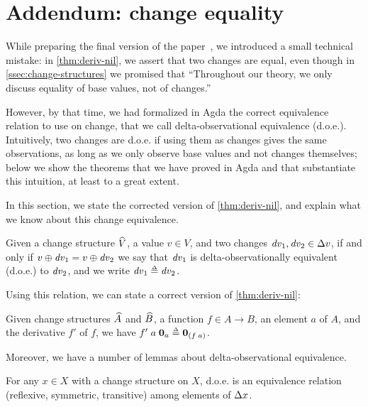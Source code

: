 \section{Addendum: change equality}
\label{sec:change-eq}

While preparing the final version of the paper~\citep{CaiEtAl2014ILC}, we introduced a
small technical mistake: in \cref{thm:deriv-nil}, we assert that
two changes are equal, even though in
\cref{ssec:change-structures} we promised that ``Throughout
our theory, we only discuss equality of base values, not of
changes.''

However, by that time, we had formalized in Agda the correct
equivalence relation to use on change, that we call
delta-observational equivalence (d.o.e.). Intuitively, two
changes are d.o.e. if using them as changes gives the same
observations, as long as we only observe base values and not
changes themselves; below we show the theorems that we have
proved in Agda and that substantiate this intuition, at least to
a great extent.

In this section, we
state the corrected version of \cref{thm:deriv-nil}, and explain
what we know about this change equivalence.

\begin{definition}
  Given a change structure $\widehat{V}$, a value $v \in V$,
  and two changes $\D v_1, \D v_2 \in \Change{v}$, if and only if
  $\Update{v}{\D v_1} = \Update{v}{\D v_2}$ we say that $\mathit{dv}_1$
  is delta-observationally equivalent (d.o.e.) to $\mathit{dv}_2$, and
  we write $\D v_1 \Doe \D v_2$.
\end{definition}

Using this relation, we can state a correct version of
\cref{thm:deriv-nil}:

\begin{lemma}
  \label{thm:deriv-nil-2}
  Given change structures $\widehat{A}$ and
  $\widehat{B}$, a function $f \in A \to B$, an element $a$
  of $A$, and the derivative $f'$ of $f$, we have
  $\App{\App{f'}{a}}{\NilC{a}} \Doe \NilC{\App* f a}$.
\end{lemma}

Moreover, we have a number of lemmas about delta-observational
equivalence.


\begin{lemma}[D.o.e. is an equivalence]
  For any $x \in X$ with a change structure on $X$, d.o.e. is an
  equivalence relation (reflexive, symmetric, transitive) among
  elements of $\Change{x}$.
\end{lemma}

